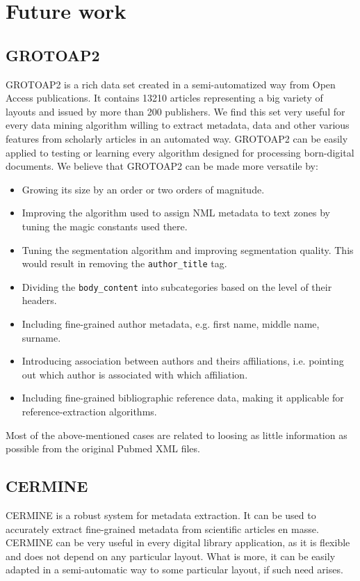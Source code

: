 \clearpage
\restoregeometry
\section{Future work}
\subsection{GROTOAP2}
GROTOAP2 is a rich data set created in a semi-automatized way from Open Access publications. It contains 13210 articles representing a big variety of layouts and issued by more than 200 publishers. We find this set very useful for every data mining algorithm willing to extract metadata, data and other various features from scholarly articles in an automated way. GROTOAP2 can be easily applied to testing or learning every algorithm designed for processing born-digital documents.
\quad
We believe that GROTOAP2 can be made more versatile by:
\begin{itemize}
\item Growing its size by an order or two orders of magnitude.
\item Improving the algorithm used to assign NML metadata to text zones by tuning the magic constants used there.
\item Tuning the segmentation algorithm and improving segmentation quality. This would result in removing the \verb+author_title+ tag.
\item Dividing the \verb+body_content+ into subcategories based on the level of their headers.
\item Including fine-grained author metadata, e.g. first name, middle name, surname.
\item Introducing association between authors and theirs affiliations, i.e. pointing out which author is associated with which affiliation.
\item Including fine-grained bibliographic reference data, making it applicable for reference-extraction algorithms.
\end{itemize}
Most of the above-mentioned cases are related to loosing as little information as possible from the original Pubmed XML files.

\subsection{CERMINE}
CERMINE is a robust system for metadata extraction. It can be used to accurately extract fine-grained metadata from scientific articles en masse. CERMINE can be very useful in every digital library application, as it is flexible and does not depend on any particular layout. What is more, it can be easily adapted in a semi-automatic way to some particular layout, if such need arises.


